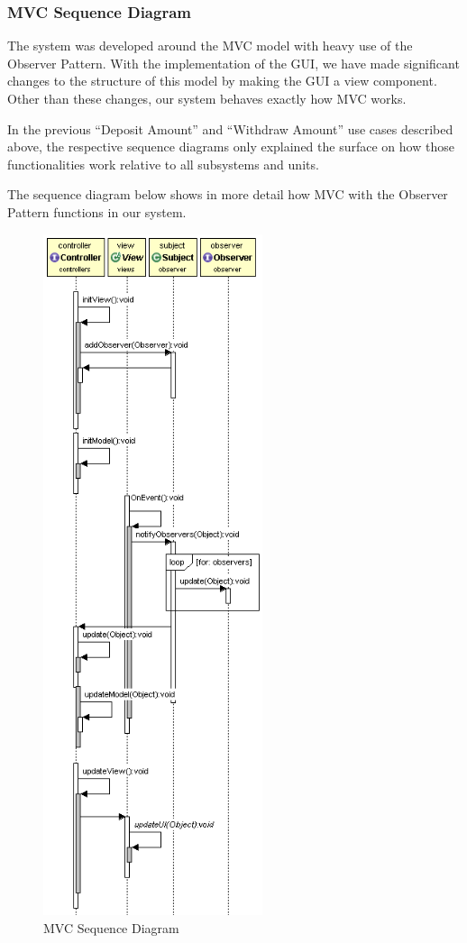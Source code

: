 \documentclass[12pt]{article}
\begin{document}
\subsubsection{MVC Sequence Diagram}

The system was developed around the MVC model with heavy use of the Observer Pattern. With the implementation of the GUI, we have made significant changes to the structure of this model by making the GUI a view component. Other than these changes, our system behaves exactly how MVC works. 

In the previous “Deposit Amount” and “Withdraw Amount” use cases described above, the respective sequence diagrams only explained the surface on how those functionalities work relative to all subsystems and units.

The sequence diagram below shows in more detail how MVC with the Observer Pattern functions in our system.    


\begin{figure}[h!]
  \centering
  \includegraphics[height=200mm]{mvc_sequence.png}
  \caption{MVC Sequence Diagram}
\end{figure}
\vspace*{-0.5in}
\clearpage
\end{document}
